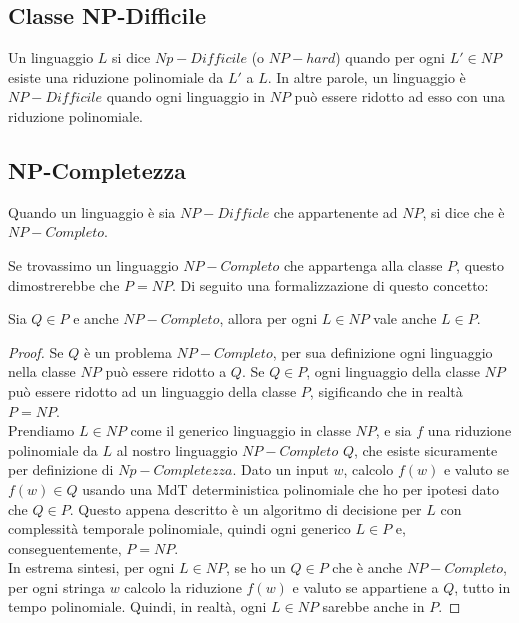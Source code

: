 \subsection{Classe NP-Difficile}

\begin{defn}
	Un linguaggio $L$ si dice $Np-Difficile$ (o $NP-hard$) quando per ogni $L' \in NP$ esiste una riduzione polinomiale da $L'$ a $L$. In altre parole, un linguaggio è $NP-Difficile$ quando ogni linguaggio in $NP$ può essere ridotto ad esso con una riduzione polinomiale.
\end{defn}

\subsection{NP-Completezza}

\begin{defn}
	Quando un linguaggio è sia $NP-Difficle$ che appartenente ad $NP$, si dice che è $NP-Completo$.
\end{defn}

Se trovassimo un linguaggio $NP-Completo$ che appartenga alla classe $P$, questo dimostrerebbe che $P = NP$. Di seguito una formalizzazione di questo concetto:

\begin{lemm}
	Sia $Q \in P$ e anche $NP-Completo$, allora per ogni $L \in NP$ vale anche $L \in P$.
\end{lemm}

\begin{proof}
	Se $Q$ è un problema $NP-Completo$, per sua definizione ogni linguaggio nella classe $NP$ può essere ridotto a $Q$. Se $Q \in P$, ogni linguaggio della classe $NP$ può essere ridotto ad un linguaggio della classe $P$, sigificando che in realtà $P = NP$. \\ Prendiamo $L \in NP$ come il generico linguaggio in classe $NP$, e sia $f$ una riduzione polinomiale da $L$ al nostro linguaggio $NP-Completo$ $Q$, che esiste sicuramente per definizione di $Np-Completezza$. Dato un input $w$, calcolo $f(w)$ e valuto se $f(w) \in Q$ usando una MdT deterministica polinomiale che ho per ipotesi dato che $Q \in P$. Questo appena descritto è un algoritmo di decisione per $L$ con complessità temporale polinomiale, quindi ogni generico $L \in P$ e, conseguentemente, $P = NP$. \\
	In estrema sintesi, per ogni $L \in NP$, se ho un $Q \in P$ che è anche $NP-Completo$, per ogni stringa $w$ calcolo la riduzione $f(w)$ e valuto se appartiene a $Q$, tutto in tempo polinomiale. Quindi, in realtà, ogni $L \in NP$ sarebbe anche in $P$.

\end{proof}

